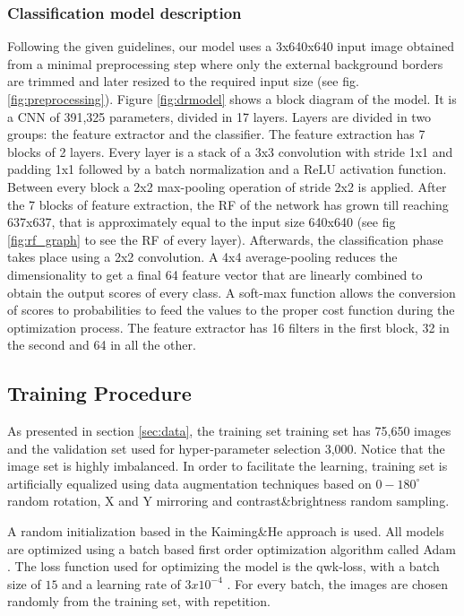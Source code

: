 \documentclass[review]{elsarticle}
\theoremstyle{definition} %
\theoremstyle{remark}
\begin{document}
\subsubsection{Classification model description}

Following the given guidelines, our model uses a 3x640x640 input image obtained from a minimal preprocessing step where only the external background borders are trimmed and later resized to the required input size (see fig. \ref{fig:preprocessing}). Figure \ref{fig:drmodel} shows a block diagram of the model. It is a CNN of 391,325 parameters, divided in 17 layers. Layers are divided in two groups: the feature extractor and the classifier. The feature extraction has 7 blocks of 2 layers. Every layer is a stack of a 3x3 convolution with stride 1x1 and padding 1x1 followed by a batch normalization and a ReLU activation function. Between every block a 2x2 max-pooling operation of stride 2x2 is applied. After the 7 blocks of feature extraction, the RF of the network has grown till reaching 637x637, that is approximately equal to the input size 640x640 (see fig \ref{fig:rf_graph} to see the RF of every layer). Afterwards, the classification phase takes place using a 2x2 convolution. A 4x4 average-pooling reduces the dimensionality to get a final 64 feature vector that are linearly combined to obtain the output scores of every class. A soft-max function allows the conversion of scores to probabilities to feed the values to the proper cost function during the optimization process. The feature extractor has 16 filters in the first block, 32 in the second and 64 in all the other.

\subsection{Training Procedure}

As presented in section \ref{sec:data}, the training set training set has 75,650 images and the validation set used for hyper-parameter selection 3,000. Notice that the image set is highly imbalanced. In order to facilitate the learning, training set is artificially equalized using data augmentation techniques \cite{Krizhevsky:2012} based on $0-180^{\circ}$ random rotation, X and Y mirroring and contrast\&brightness random sampling.

A random initialization based in the Kaiming\&He approach \cite{kaiming} is used. All models are optimized using a batch based first order optimization algorithm called Adam \cite{DBLP:journals/corr/KingmaB14}. The loss function used for optimizing the model is the qwk-loss, with a batch size of $15$ and a learning rate of $3x10^{-4}$ \cite{DELATORRE2017}. For every batch, the images are chosen randomly from the training set, with repetition. 
\end{document}
